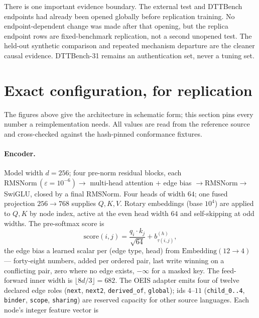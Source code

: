 \documentclass[11pt]{article}
\newcommand{\code}[1]{\texttt{#1}}
\begin{document}
There is one important evidence boundary. The external test and DTTBench endpoints had
already been opened globally before replication training. No endpoint-dependent change
was made after that opening, but the replica endpoint rows are fixed-benchmark
replication, not a second unopened test. The held-out synthetic comparison and repeated
mechanism departure are the cleaner causal evidence. DTTBench-31 remains an
authentication set, never a tuning set.

\section{Exact configuration, for replication}
\label{sec:config}

The figures above give the architecture in schematic form; this section pins every number a
reimplementation needs. All values are read from the reference source and cross-checked
against the hash-pinned conformance fixtures.

\paragraph{Encoder.} Model width $d=256$; four pre-norm residual blocks, each
$\mathrm{RMSNorm}\,(\varepsilon=10^{-6})\to$ multi-head attention $+$ edge bias $\to
\mathrm{RMSNorm}\to$ SwiGLU, closed by a final RMSNorm. Four heads of width $64$; one fused
projection $256\to768$ supplies $Q,K,V$. Rotary embeddings (base $10^4$) are applied to
$Q,K$ by node index, active at the even head width $64$ and self-skipping at odd widths. The
pre-softmax score is
\[
  \mathrm{score}(i,j)=\frac{q_i\cdot k_j}{\sqrt{64}}+b^{(h)}_{\tau(i,j)},
\]
the edge bias a learned scalar per (edge type, head) from $\mathrm{Embedding}(12\to4)$ ---
forty-eight numbers, added per ordered pair, last write winning on a conflicting pair, zero
where no edge exists, $-\infty$ for a masked key. The feed-forward inner width is
$\lfloor 8d/3\rfloor=682$. The OEIS adapter emits four of twelve declared edge roles
(\code{next}, \code{next2}, \code{derived\_of}, \code{global}); ids $4$--$11$
(\code{child\_0..4}, \code{binder}, \code{scope}, \code{sharing}) are reserved capacity for
other source languages. Each node's integer feature vector is
\end{document}
